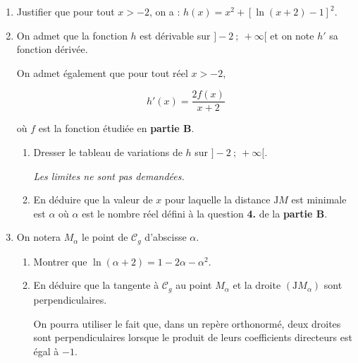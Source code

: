 \documentclass[10pt]{article}
\begin{document}
\begin{enumerate}
\item Justifier que pour tout $x>-2$, on a : \quad $h(x)=x^{2}+[\ln (x+2)-1]^{2}$.

\item On admet que la fonction $h$ est dérivable sur $]-2 ~;~ +\infty[$ et on note $h'$ sa fonction dérivée.

On admet également que pour tout réel $x>-2$,

$$h'(x)=\dfrac{2 f(x)}{x+2}$$

où $f$ est la fonction étudiée en \textbf{partie B}.

\begin{enumerate}
	\item Dresser le tableau de variations de $h$ sur $]-2 ~;~ +\infty[$.

	\emph{Les limites ne sont pas demandées.}

	\item En déduire que la valeur de $x$ pour laquelle la distance $\mathrm{J}M$ est minimale est $\alpha$ où $\alpha$ est le nombre réel défini à la question \textbf{4.} de la \textbf{partie B}.
\end{enumerate}

\item On notera $M_{\alpha}$ le point de $\mathcal{C}_{g}$ d'abscisse $\alpha$.

	\begin{enumerate}
		\item Montrer que \quad $\ln (\alpha+2)=1-2 \alpha-\alpha^{2}$.

		\item En déduire que la tangente à $\mathcal{C}_{g}$ au point $M_{\alpha}$ et la droite $\left(\mathrm{J}M_{\alpha}\right)$ sont perpendiculaires.

On pourra utiliser le fait que, dans un repère orthonormé, deux droites sont perpendiculaires lorsque le produit de leurs coefficients directeurs est égal à $-1$.
	\end{enumerate}
\end{enumerate}

\bigskip
\end{document}
